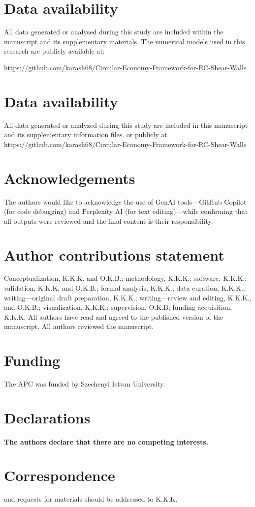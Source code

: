 \documentclass[fleqn,10pt]{wlscirep}
\begin{document}
\section*{Data availability}

All data generated or analysed during this study are included within the manuscript
and its supplementary materials. The numerical models used in this research are
publicly available at:

\url{https://github.com/karash68/Circular-Economy-Framework-for-RC-Shear-Walls}

\section*{Data availability}
All data generated or analyzed during this study are included in this manuscript and its supplementary information files. or publicly at https://github.com/karash68/Circular-Economy-Framework-for-RC-Shear-Walls




\section*{Acknowledgements}
The authors would like to acknowledge the use of GenAI tools—GitHub Copilot (for code debugging) and Perplexity AI (for text editing)—while confirming that all outputs were reviewed and the final content is their responsibility.

\section*{Author contributions statement}
Conceptualization, K.K.K. and O.K.B.; methodology, K.K.K.; software, K.K.K.; validation, K.K.K, and O.K.B.; formal analysis, K.K.K.; data curation, K.K.K.; writing—original draft preparation, K.K.K.; writing—review and editing, K.K.K., and O.K.B.; visualization, K.K.K.; supervision, O.K.B; funding acquisition, K.K.K. All authors have read and agreed to the published version of the manuscript.  All authors reviewed the manuscript.
\section*{Funding}
The APC was funded by Szechenyi Istvan University.
\section*{Declarations}
\paragraph{The authors declare that there are no competing interests.}

\section*{Correspondence}
and requests for materials should be addressed to K.K.K.
\end{document}
